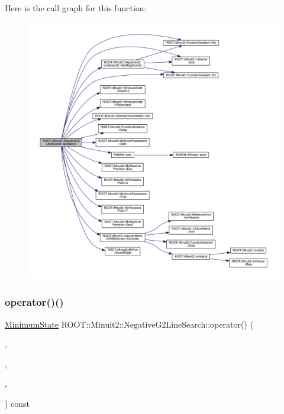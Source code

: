 Here is the call graph for this function\+:
\nopagebreak
\begin{figure}[H]
\begin{center}
\leavevmode
\includegraphics[width=350pt]{d3/d6b/classROOT_1_1Minuit2_1_1NegativeG2LineSearch_ac39ff4c0d14335bd8c8bdcede066ecdf_cgraph}
\end{center}
\end{figure}
\mbox{\label{classROOT_1_1Minuit2_1_1NegativeG2LineSearch_ac39ff4c0d14335bd8c8bdcede066ecdf}} 
\subsubsection{\texorpdfstring{operator()()}{operator()()}\hspace{0.1cm}{\footnotesize\ttfamily [2/3]}}
{\footnotesize\ttfamily \mbox{\hyperlink{classROOT_1_1Minuit2_1_1MinimumState}{Minimum\+State}} R\+O\+O\+T\+::\+Minuit2\+::\+Negative\+G2\+Line\+Search\+::operator() (\begin{DoxyParamCaption}\item[{const \mbox{\hyperlink{classROOT_1_1Minuit2_1_1MnFcn}{Mn\+Fcn}} \&}]{,  }\item[{const \mbox{\hyperlink{classROOT_1_1Minuit2_1_1MinimumState}{Minimum\+State}} \&}]{,  }\item[{const \mbox{\hyperlink{classROOT_1_1Minuit2_1_1GradientCalculator}{Gradient\+Calculator}} \&}]{,  }\item[{const \mbox{\hyperlink{classROOT_1_1Minuit2_1_1MnMachinePrecision}{Mn\+Machine\+Precision}} \&}]{ }\end{DoxyParamCaption}) const}

